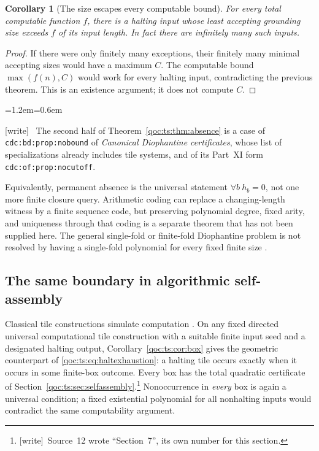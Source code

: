 \documentclass[11pt,letterpaper]{article}
\newtheorem{corollary}[theorem]{Corollary}
\theoremstyle{definition}
\theoremstyle{remark}
\newcommand{\wtag}{\textup{[write]}}
\newenvironment{writenote}{\par\smallskip\begin{list}{}{\leftmargin=1.2em\rightmargin=0.6em}\item[]\small\wtag\ }{\end{list}\smallskip}
\newcommand{\lab}[1]{\nolinkurl{#1}}
\begin{document}
\begin{corollary}[The size escapes every computable bound]
For every total computable function $f$, there is a halting input whose
least accepting grounding size exceeds $f$ of its input length. In fact
there are infinitely many such inputs.
\end{corollary}
\begin{proof}
If there were only finitely many exceptions, their finitely many minimal
accepting sizes would have a maximum $C$. The computable bound
$\max(f(n),C)$ would work for every halting input, contradicting the
previous theorem. This is an existence argument; it does not compute $C$.
\end{proof}

\begin{writenote}
The second half of Theorem~\ref{qoc:ts:thm:absence} is a case of \lab{cdc:bd:prop:nobound} of \emph{Canonical Diophantine certificates}, whose list of specializations already includes tile systems, and of its Part~XI form \lab{cdc:of:prop:nocutoff}.
\end{writenote}

Equivalently, permanent absence is the universal statement
$\forall b\ h_b=0$, not one more finite closure query. Arithmetic coding
can replace a changing-length witness by a finite sequence code, but
preserving polynomial degree, fixed arity, and uniqueness through that
coding is a separate theorem that has not been supplied here. The general
single-fold or finite-fold Diophantine problem is not resolved by having a
single-fold polynomial for every fixed finite size \cite{ts:matiyasevich}.

\subsection{The same boundary in algorithmic self-assembly}
Classical tile constructions simulate computation \cite{ts:winfree}. On any
fixed directed universal computational tile construction with a suitable
finite input seed and a designated halting output, Corollary~\ref{qoc:ts:cor:box}
gives the geometric counterpart of \eqref{qoc:ts:eq:haltexhaustion}: a halting
tile occurs exactly when it occurs in some finite-box outcome. Every box
has the total quadratic certificate of Section~\ref{qoc:ts:sec:selfassembly}.\footnote{\wtag\ Source~12 wrote ``Section~7'', its own number for this section.} Nonoccurrence in
\emph{every} box is again a universal condition; a fixed existential
polynomial for all nonhalting inputs would contradict the same
computability argument.
\end{document}
